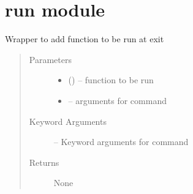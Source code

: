 \documentclass[letterpaper,10pt,english]{sphinxmanual}
\begin{document}
\chapter{run module}
\label{\detokenize{run:module-run}}\label{\detokenize{run::doc}}\label{\detokenize{run:run-module}}

\begin{fulllineitems}
\label{\detokenize{run:run.addatexit__}}
Wrapper to add function to be run at exit
\begin{quote}\begin{description}
\item[{Parameters}] \leavevmode\begin{itemize}
\item {} 
 () -- function to be run

\item {} 
 -- arguments for command

\end{itemize}

\item[{Keyword Arguments}] \leavevmode
{} -- Keyword arguments for command

\item[{Returns}] \leavevmode
None

\end{description}\end{quote}

\end{fulllineitems}

\end{document}
